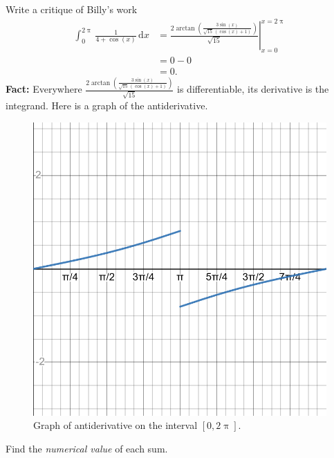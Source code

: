 \documentclass[fleqn,12pt]{exam}
\begin{document}
\begin{questions}
\question Write a critique of Billy's work
\begin{align*}
   \int_0^{2 \uppi} \frac{1}{4 + \cos(x)} \, \mathrm{d} x &= \left. \frac{2 \arctan\left( \frac{3 \sin{(x)}}{\sqrt{15}\, \left( \cos{(x)}+1\right) }\right) }{\sqrt{15}} \right|^{x = 2 \uppi}_{x=0} \\
   &= 0 - 0 \\
   &= 0.   
\end{align*}
\textbf{Fact:} Everywhere $\frac{2 \arctan\left( \frac{3 \sin{(x)}}{\sqrt{15}\, \left( \cos{(x)}+1\right) }\right) }{\sqrt{15}}$ is
differentiable, its derivative is the integrand. Here is a graph of the antiderivative.

\begin{figure}[h]
\begin{center}
\includegraphics[scale=0.1]{desmos-graph(42)}
\caption{Graph of antiderivative on the interval $[0, 2 \uppi]$.}
\end{center}
\end{figure}



\question Find the \emph{numerical value} of each sum.
\end{questions}
\end{document}
